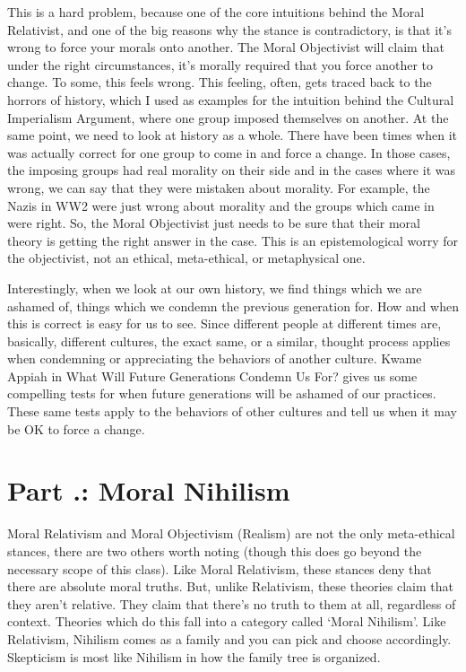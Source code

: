 This is a hard problem, because one of the core intuitions behind the Moral Relativist, and one of the big reasons why the stance is contradictory, is that it’s wrong to force your morals onto another. The Moral Objectivist will claim that under the right circumstances, it’s morally required that you force another to change. To some, this feels wrong. This feeling, often, gets traced back to the horrors of history, which I used as examples for the intuition behind the Cultural Imperialism Argument, where one group imposed themselves on another. At the same point, we need to look at history as a whole. There have been times when it was actually correct for one group to come in and force a change. In those cases, the imposing groups had real morality on their side and in the cases where it was wrong, we can say that they were mistaken about morality. For example, the Nazis in WW2 were just wrong about morality and the groups which came in were right. So, the Moral Objectivist just needs to be sure that their moral theory is getting the right answer in the case. This is an epistemological worry for the objectivist, not an ethical, meta-ethical, or metaphysical one. 

Interestingly, when we look at our own history, we find things which we are ashamed of, things which we condemn the previous generation for. How and when this is correct is easy for us to see. Since different people at different times are, basically, different cultures, the exact same, or a similar, thought process applies when condemning or appreciating the behaviors of another culture. Kwame Appiah in What Will Future Generations Condemn Us For?\autocite{Appiah1} gives us some compelling tests for when future generations will be ashamed of our practices. These same tests apply to the behaviors of other cultures and tell us when it may be OK to force a change. 

\section{Part \thechapcount.\theseccount: Moral Nihilism}

Moral Relativism and Moral Objectivism (Realism) are not the only meta-ethical stances, there are two others worth noting (though this does go beyond the necessary scope of this class). Like Moral Relativism, these stances deny that there are absolute moral truths. But, unlike Relativism, these theories claim that they aren't relative. They claim that there's no truth to them at all, regardless of context. Theories which do this fall into a category called `Moral Nihilism'. Like Relativism, Nihilism comes as a family and you can pick and choose accordingly. Skepticism is most like Nihilism in how the family tree is organized. 


